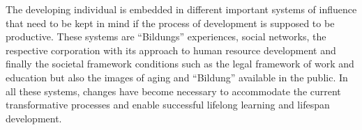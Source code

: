 



\newpage




The developing individual is embedded in different important systems of influence that need to be kept in mind if the process of development is supposed to be productive. These systems are ``Bildungs'' experiences, social networks, the respective corporation with its approach to human resource development and finally the societal framework conditions such as the legal framework of work and education but also the images of aging and ``Bildung'' available in the public. In all these systems, changes have become necessary to accommodate the current transformative processes and enable successful lifelong learning and lifespan development. 


